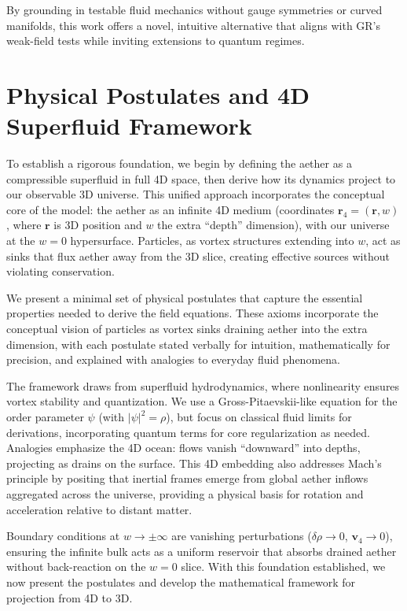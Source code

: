 \documentclass{article}
\begin{document}
By grounding in testable fluid mechanics without gauge symmetries or curved manifolds, this work offers a novel, intuitive alternative that aligns with GR's weak-field tests while inviting extensions to quantum regimes.

\section{Physical Postulates and 4D Superfluid Framework}

To establish a rigorous foundation, we begin by defining the aether as a compressible superfluid in full 4D space, then derive how its dynamics project to our observable 3D universe. This unified approach incorporates the conceptual core of the model: the aether as an infinite 4D medium (coordinates $\mathbf{r}_4 = (\mathbf{r}, w)$, where $\mathbf{r}$ is 3D position and $w$ the extra ``depth'' dimension), with our universe at the $w=0$ hypersurface. Particles, as vortex structures extending into $w$, act as sinks that flux aether away from the 3D slice, creating effective sources without violating conservation.

We present a minimal set of physical postulates that capture the essential properties needed to derive the field equations. These axioms incorporate the conceptual vision of particles as vortex sinks draining aether into the extra dimension, with each postulate stated verbally for intuition, mathematically for precision, and explained with analogies to everyday fluid phenomena.

The framework draws from superfluid hydrodynamics, where nonlinearity ensures vortex stability and quantization. We use a Gross-Pitaevskii-like equation for the order parameter $\psi$ (with $|\psi|^2 = \rho$), but focus on classical fluid limits for derivations, incorporating quantum terms for core regularization as needed. Analogies emphasize the 4D ocean: flows vanish ``downward'' into depths, projecting as drains on the surface. This 4D embedding also addresses Mach's principle by positing that inertial frames emerge from global aether inflows aggregated across the universe, providing a physical basis for rotation and acceleration relative to distant matter.

Boundary conditions at $w \to \pm \infty$ are vanishing perturbations ($\delta \rho \to 0$, $\mathbf{v}_4 \to 0$), ensuring the infinite bulk acts as a uniform reservoir that absorbs drained aether without back-reaction on the $w=0$ slice. With this foundation established, we now present the postulates and develop the mathematical framework for projection from 4D to 3D.
\end{document}
